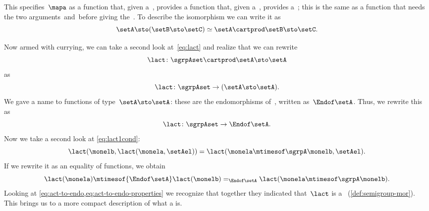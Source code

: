 This specifies~$\mapa$ as a function that, given a~\setA, provides a function that, given a~\setB, provides a~\setC;
this is the same as a function that needs the two arguments~\setA and~\setB before giving the~\setC.
To describe the isomorphism we can write it as
\begin{equation}
    \label{eq:currying-iso-1}
    \setA \sto ( \setB \sto \setC) \simeq  \setA \cartprod \setB \sto \setC.
\end{equation}


Now armed with currying, we can take a second look at~\cref{eq:lact} and realize that we can rewrite
\begin{equation}
    \label{eq:currying-lact-1}
    \lact \colon \sgrpAset \cartprod \setA \sto \setA
\end{equation}
as
\begin{equation}
    \label{eq:currying-lact-2}
    \lact \colon \sgrpAset \to (\setA \sto \setA).
\end{equation}
%
We gave a name to functions of type~$\setA \sto \setA$: these are the endomorphisms of~\setA, written as~$\Endof\setA$.
Thus, we rewrite this as
%
\begin{equation}
    \label{eq:act-to-endo}
    \lact \colon \sgrpAset \to \Endof\setA.
\end{equation}
%
Now we take a second look at \cref{eq:lact1cond}:
%
\begin{equation}
    \label{eq:lact1cond-2}
    \lact(\monelb, \lact(\monela, \setAel)) = \lact(\monela \mtimesof\sgrpA \monelb, \setAel).
\end{equation}
%
If we rewrite it as an equality of functions, we obtain
%
\begin{equation}
    \label{eq:act-to-endo-properties}
    \lact(\monela) \mtimesof{\Endof\setA}  \lact(\monelb) =_{\Endof\setA} \lact(\monela \mtimesof\sgrpA \monelb).
\end{equation}
%
Looking at \cref{eq:act-to-endo,eq:act-to-endo-properties} we recognize that together they indicated that~$\lact$ is a ~(\cref{def:semigroup-mor}).
This brings us to a more compact description of what a  is.

